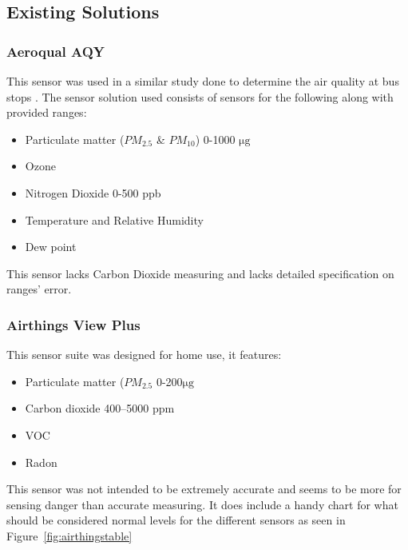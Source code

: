 \pagebreak
\subsection{Existing Solutions}

\subsubsection{Aeroqual AQY}
This sensor was used in a similar study done to determine the air quality at bus stops \cite{busstop}. 
The sensor solution used consists of sensors for the following along with provided ranges\cite{sensoraq}:

\begin{itemize}
	\item Particulate matter ($PM_{2.5}$ \& $PM_{10}$) 0-1000 $ \si{\micro\gram}$
	\item Ozone
	\item Nitrogen Dioxide 0-500 ppb
	\item Temperature and Relative Humidity
	\item Dew point
\end{itemize}
This sensor lacks Carbon Dioxide measuring and lacks detailed specification on ranges' error.


\subsubsection{Airthings View Plus}
This sensor suite was designed for home use, it features:
\begin{itemize}
	\item Particulate matter ($PM_{2.5}$ 0-200$ \si{\micro\gram}$
	\item Carbon dioxide 400–5000 ppm
	\item VOC
	\item Radon
\end{itemize}
This sensor was not intended to be extremely accurate and seems to be more for sensing danger than accurate measuring.
It does include a handy chart for what should be considered normal levels for the different sensors as seen in Figure~\ref{fig:airthingstable}


